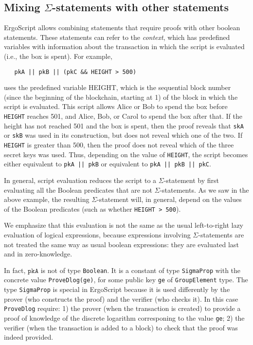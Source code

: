 \documentclass[11pt]{article}
\newcommand{\langname}{ErgoScript\xspace}
\begin{document}
\subsection{Mixing $\Sigma$-statements with other statements}
\langname allows combining statements that require proofs with other boolean statements. These statements can refer to the \emph{context}, which has predefined variables with information about the transaction in which the script is evaluated (i.e., the box is spent). For example,

\begin{verbatim}
   pkA || pkB || (pkC && HEIGHT > 500)
\end{verbatim}
uses the predefined variable HEIGHT, which is the sequential block number (since the beginning of the blockchain, starting at 1)
of the block in which the script is evaluated.
This script allows Alice or Bob to spend the box before \texttt{HEIGHT} reaches 501, and Alice, Bob, or Carol to spend the box after that. If the height has not reached 501 and the box is spent, then the proof reveals that \texttt{skA} or \texttt{skB} was used in its construction, but does not reveal which one of the two. If \texttt{HEIGHT} is greater than 500, then the proof does not reveal which of the three secret keys was used. Thus, depending on the value of \texttt{HEIGHT}, the script becomes either equivalent to \texttt{pkA || pkB} or equivalent to \texttt{pkA || pkB || pkC}.

In general, script evaluation reduces the script to a $\Sigma$-statement by first evaluating all the Boolean predicates that are not $\Sigma$-statements. As we saw in the above example, the resulting $\Sigma$-statement will, in general, depend on the values of the Boolean predicates (such as whether \texttt{HEIGHT > 500}).

We emphasize that this evaluation is not the same as the usual left-to-right
lazy evaluation of logical expressions, because expressions involving
$\Sigma$-statements are not treated the same way as usual boolean
expressions: they are evaluated last and in zero-knowledge.

In fact, $\texttt{pkA}$ is not of type \texttt{Boolean}. It is a constant of
type \texttt{SigmaProp} with the concrete value
\texttt{ProveDlog(\texttt{ge})}, for some public key \texttt{ge} of
\texttt{GroupElement} type. The type \texttt{SigmaProp} is special in
\langname because it is used differently by the prover (who constructs the
proof) and the verifier (who checks it). In this case \texttt{ProveDlog}
require: 1) the prover (when the transaction is created) to provide a proof
of knowledge of the discrete logarithm corresponing to the value \texttt{ge};
2) the verifier (when the transaction is added to a block) to check that the
proof was indeed provided.
\end{document}
